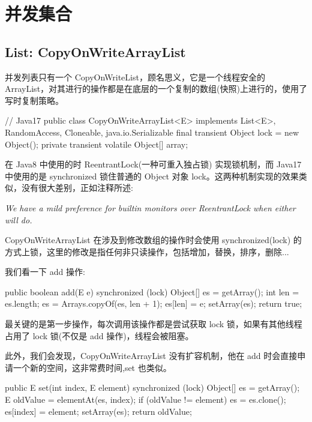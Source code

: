 \section{并发集合}
\subsection{List: CopyOnWriteArrayList}

并发列表只有一个 CopyOnWriteList，顾名思义，它是一个线程安全的 ArrayList，对其进行的操作都是在底层的一个复制的数组(快照)上进行的，使用了写时复制策略。

\begin{Java}
// Java17
public class CopyOnWriteArrayList<E> implements List<E>, RandomAccess, Cloneable, java.io.Serializable {
    final transient Object lock = new Object();
    private transient volatile Object[] array;
}
\end{Java}

在 Java8 中使用的时 ReentrantLock(一种可重入独占锁) 实现锁机制，而 Java17 中使用的是 synchronized 锁住普通的 Object 对象 lock。这两种机制实现的效果类似，没有很大差别，正如注释所述:

\begin{center}
\textit{We have a mild preference for builtin monitors over ReentrantLock when either will do.}
\end{center}

CopyOnWriteArrayList 在涉及到修改数组的操作时会使用 synchronized(lock) 的方式上锁，这里的修改是指任何非只读操作，包括增加，替换，排序，删除...

我们看一下 add 操作:

\begin{Java}
public boolean add(E e) {
    synchronized (lock) {
        Object[] es = getArray();
        int len = es.length;
        es = Arrays.copyOf(es, len + 1);
        es[len] = e;
        setArray(es);
        return true;
    }
}
\end{Java}

最关键的是第一步操作，每次调用该操作都是尝试获取 lock 锁，如果有其他线程占用了 lock 锁(不仅是 add 操作)，线程会被阻塞。

此外，我们会发现，CopyOnWriteArrayList 没有扩容机制，他在 add 时会直接申请一个新的空间，这非常费时间,set 也类似。

\begin{Java}
public E set(int index, E element) {
    synchronized (lock) {
        Object[] es = getArray();
        E oldValue = elementAt(es, index);
        if (oldValue != element) {
            es = es.clone();
            es[index] = element;
        }
        setArray(es);
        return oldValue;
    }
}
\end{Java}

